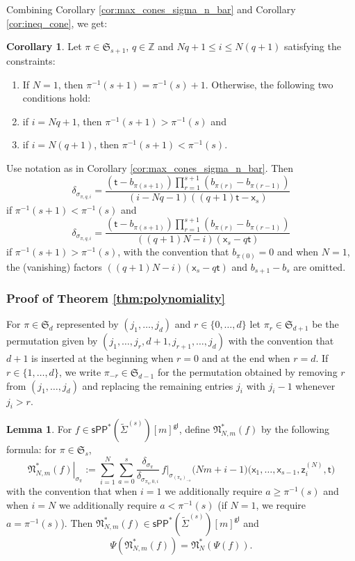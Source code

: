 \documentclass[11pt]{article}
\newcommand{\sPP}{\mathsf{sPP}}
\newcommand{\spp}{\sPP}
\theoremstyle{definition}
\newtheorem{corollary}[definition]{Corollary}
\newtheorem{lemma}[definition]{Lemma}
\begin{document}
Combining Corollary \ref{cor:max_cones_sigma_n_bar} and
Corollary \ref{cor:ineq_cone}, we get:

\begin{corollary}
	\label{cor:supp_function_sigma}
	Let $\pi\in \mathfrak S_{s+1}$,
	$q\in \mathbb{Z}$ and $Nq+1\le i\le N(q+1)$ satisfying the constraints:
	\begin{enumerate}[label = (\alph*)]
		\item If $N=1$, then $\pi^{-1}(s+1)=\pi^{-1}(s)+1$. Otherwise, the following two conditions hold:
		\item if $i=Nq+1$, then $\pi^{-1}(s+1)>\pi^{-1}(s)$ and
		\item if $i=N(q+1)$, then $\pi^{-1}(s+1)<\pi^{-1}(s)$.
	\end{enumerate}
	Use notation as in Corollary \ref{cor:max_cones_sigma_n_bar}.
	Then
	$$\delta_{\sigma_{\pi,q,i}}=\frac{(\mathsf{t}-b_{\pi(s+1)})\prod_{r=1}^{s+1} (b_{\pi(r)}-b_{\pi(r-1)})}{(i-Nq-1)((q+1)\mathsf{t}-\mathsf{x}_s)}$$
	if $\pi^{-1}(s+1)<\pi^{-1}(s)$ and
	$$\delta_{\sigma_{\pi,q,i}}=\frac{(\mathsf{t}-b_{\pi(s+1)})\prod_{r=1}^{s+1} (b_{\pi(r)}-b_{\pi(r-1)})}{((q+1)N-i)(\mathsf{x}_s-q\mathsf{t})}$$
	if $\pi^{-1}(s+1)>\pi^{-1}(s)$, with the convention that
	$b_{\pi(0)}=0$ and when $N=1$, the (vanishing) factors $((q+1)N-i)(\mathsf{x}_s-q\mathsf{t})$
	and $b_{s+1}-b_s$ are omitted.
\end{corollary}

\subsubsection{Proof of Theorem \ref{thm:polynomiality}}

For $\pi\in \mathfrak S_d$ represented by $(j_1,\dots,j_d)$
and $r\in \{0,\dots,d\}$ let $\pi_r\in \mathfrak S_{d+1}$ be the permutation given by
$(j_1,\dots,j_r,d+1,j_{r+1},\dots,j_d)$ with the convention that $d+1$ is inserted
at the beginning when $r=0$ and at the end when $r=d$.
If $r\in \{1,\dots,d\}$, we write $\pi_{-r}\in \mathfrak S_{d-1}$ for the permutation obtained by
removing $r$ from $(j_1,\dots,j_d)$ and replacing the remaining entries $j_i$ with $j_i-1$
whenever $j_i>r$.

\begin{lemma}
	\label{lem:combinat_lift}
	For $f\in \spp^{\ast}(\tilde{\Sigma}^{(s)})[m]^{\mathsf{gl}}$, define
	$\mathfrak{N}_{N,m}^\ast(f)$ by the following formula: for $\pi\in \mathfrak S_{s}$,
	\[
		\left.\mathfrak{N}_{N,m}^\ast(f)\right|_{\sigma_{\pi}}
			:=\sum_{i=1}^{N}\sum_{a=0}^{s}
			\frac{\delta_{\sigma_{\pi}}}{\delta_{\sigma_{\pi_a,0,i}}}\,
			f|_{\sigma_{(\pi_a)_{-s}}}
			\bigl(Nm+i-1\bigr)
			\bigl(\mathsf{x}_1,\dots,\mathsf{x}_{s-1},\mathsf{z}_i^{(N)},\mathsf{t}\bigr)
	\]
	with the convention that when $i=1$ we additionally require
	$a\ge \pi^{-1}(s)$ and when $i=N$ we additionally require $a<\pi^{-1}(s)$ (if $N=1$, we require $a=\pi^{-1}(s)$).
	Then $\mathfrak{N}_{N,m}^\ast(f)\in \spp^{\ast}(\tilde{\Sigma}^{(s)})[m]^{\mathsf{gl}}$ and
	$$\Psi(\mathfrak{N}_{N,m}^\ast(f))=\mathfrak{N}_N^\ast(\Psi(f)).$$
\end{lemma}
\end{document}
